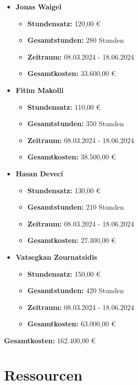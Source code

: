 \begin{itemize}
    \item \textbf{Jonas Waigel}
    \begin{itemize}
        \item \textbf{Stundensatz:} 120,00 €
        \item \textbf{Gesamtstunden:} 280 Stunden
        \item \textbf{Zeitraum:} 08.03.2024 - 18.06.2024
        \item \textbf{Gesamtkosten:} 33.600,00 €
    \end{itemize}

    \item \textbf{Fitim Makolli}
    \begin{itemize}
        \item \textbf{Stundensatz:} 110,00 €
        \item \textbf{Gesamtstunden:} 350 Stunden
        \item \textbf{Zeitraum:} 08.03.2024 - 18.06.2024
        \item \textbf{Gesamtkosten:} 38.500,00 €
    \end{itemize}

    \item \textbf{Hasan Deveci}
    \begin{itemize}
        \item \textbf{Stundensatz:} 130,00 €
        \item \textbf{Gesamtstunden:} 210 Stunden
        \item \textbf{Zeitraum:} 08.03.2024 - 18.06.2024
        \item \textbf{Gesamtkosten:} 27.300,00 €
    \end{itemize}

    \item \textbf{Vatsegkan Zournatsidis}
    \begin{itemize}
        \item \textbf{Stundensatz:} 150,00 €
        \item \textbf{Gesamtstunden:} 420 Stunden
        \item \textbf{Zeitraum:} 08.03.2024 - 18.06.2024
        \item \textbf{Gesamtkosten:} 63.000,00 €
    \end{itemize}
\end{itemize}

\textbf{Gesamtkosten:} 162.400,00 €

\section{Ressourcen}

